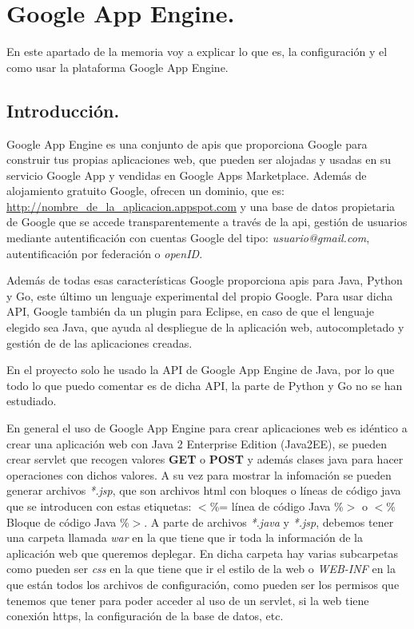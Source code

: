 \chapter{Google App Engine.}
En este apartado de la memoria voy a explicar lo que es, la configuración y el como usar la plataforma Google App Engine.

\section{Introducción.}
Google App Engine es una conjunto de apis que proporciona Google para construir tus propias aplicaciones web, que pueden ser alojadas y usadas en su servicio Google App y vendidas en Google Apps Marketplace. Además de alojamiento gratuito Google, ofrecen un dominio, que es: \url{http://nombre\_de\_la\_aplicacion.appspot.com} y una base de datos propietaria de Google que se accede transparentemente a través de la api, gestión de usuarios mediante autentificación con cuentas Google del tipo: \textit{usuario@gmail.com}, autentificación por federación o \textit{openID}.

Además de todas esas características Google proporciona apis para Java, Python y Go, este último un lenguaje experimental del propio Google. Para usar dicha API, Google también da un plugin para Eclipse, en caso de que el lenguaje elegido sea Java, que ayuda al despliegue de la aplicación web, autocompletado y gestión de de las aplicaciones creadas. 

En el proyecto solo he usado la API de Google App Engine de Java, por lo que todo lo que puedo comentar es de dicha API, la parte de Python y Go no se han estudiado.

En general el uso de Google App Engine para crear aplicaciones web es idéntico a crear una aplicación web con Java 2 Enterprise Edition (Java2EE), se pueden crear servlet que recogen valores \textbf{GET} o \textbf{POST} y además clases java para hacer operaciones con dichos valores. A su vez para mostrar la infomación se pueden generar archivos \textit{*.jsp}, que son archivos html con bloques o líneas de código java que se introducen con estas etiquetas: $<$\%= línea de código Java \%$>$ o $<$\% Bloque de código Java \%$>$. A parte de archivos \textit{*.java} y \textit{*.jsp}, debemos tener una carpeta llamada \textit{war} en la que tiene que ir toda la información de la aplicación web que queremos deplegar. En dicha carpeta hay varias subcarpetas como pueden ser \textit{css} en la que tiene que ir el estilo de la web o \textit{WEB-INF} en la que están todos los archivos de configuración, como pueden ser los permisos que tenemos que tener para poder acceder al uso de un servlet, si la web tiene conexión https, la configuración de la base de datos, etc.

